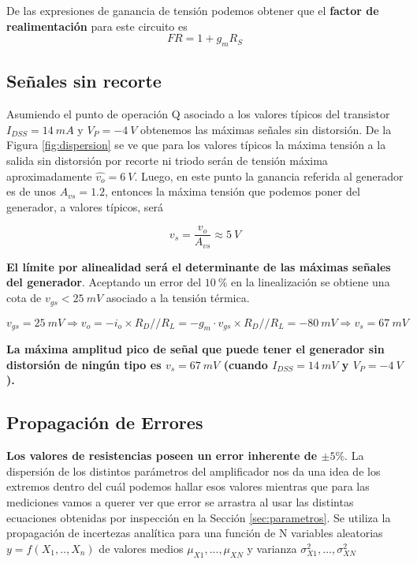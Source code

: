 \documentclass[a4paper, 10pt, spanish]{article}
\begin{document}
De las expresiones de ganancia de tensión podemos obtener que el \textbf{factor de realimentación} para este circuito es
\begin{equation}
	FR = 1+g_mR_S
	\end{equation}

\subsection{Señales sin recorte}\label{sec:distorsiones}

Asumiendo el punto de operación Q asociado a los valores típicos del transistor $I_{DSS} = 14\ mA$ y $V_P = -4\ V$ obtenemos las máximas señales sin distorsión. De la Figura \ref{fig:dispersion} se ve que para los valores típicos la máxima tensión a la salida sin distorsión por recorte ni triodo serán de tensión máxima aproximadamente $\hat{v_o} = 6\ V$. Luego, en este punto la ganancia referida al generador es de unos $A_{vs} = 1.2$, entonces la máxima tensión que podemos poner del generador, a valores típicos, será

\begin{equation}
	v_s = \frac{v_o}{A_{vs}} \approx 5\ V \nonumber
	\end{equation}

\textbf{El límite por alinealidad será el determinante de las máximas señales del generador}. Aceptando un error del $10\ \%$ en la linealización se obtiene una cota de $v_{gs} < 25\ mV$ asociado a la tensión térmica.

\begin{equation}
	v_{gs} = 25\ mV \Rightarrow v_o = -i_o\times R_D//R_L = -g_m\cdot v_{gs} \times R_D//R_L = - 80\ mV \Rightarrow v_s = 67\ mV
	\end{equation}

\textbf{La máxima amplitud pico de señal que puede tener el generador sin distorsión de ningún tipo es $v_s = 67\ mV$ (cuando $I_{DSS} = 14\ mV$ y $V_P = -4\ V$).}


\subsection{Propagación de Errores}

\textbf{Los valores de resistencias poseen un error inherente de $\pm 5 \%$}. La dispersión de los distintos parámetros del amplificador nos da una idea de los extremos dentro del cuál podemos hallar esos valores mientras que para las mediciones vamos a querer ver que error se arrastra al usar las distintas ecuaciones obtenidas por inspección en la Sección \ref{sec:parametros}. Se utiliza la propagación de incertezas analítica para una función de N variables aleatorias $y=f(X_1,..,X_n)$ de valores medios $\mu_{X1},...,\mu_{XN}$ y varianza $\sigma_{X1}^2,...,\sigma_{XN}^2$
\end{document}
